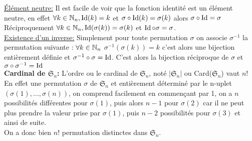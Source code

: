 \underline{Élément neutre:} Il est facile de voir que la fonction identité est un élément neutre, en effet $\forall k \in \mathbb{N}_n,\operatorname{Id}(k)=k$ et $\sigma\circ\operatorname{Id}(k)=\sigma(k)$ alors $\sigma\circ\operatorname{Id}=\sigma$\\
Réciproquement $\forall k \in \mathbb{N}_n,\operatorname{Id}(\sigma(k))=\sigma(k)$ et $\operatorname{Id}\circ\sigma=\sigma$.\\

\underline{Existence d'un inverse:} Simplement pour toute permutation $\sigma$ on associe $\sigma^{-1}$ la permutation suivante : $\forall k \in \mathbb{N}_n$ $\sigma^{-1}(\sigma(k))=k$ c'est alors une bijection entièrement définie et $\sigma^{-1}\circ\sigma=\operatorname{Id}$. C'est alors la bijection réciproque de $\sigma$ et $\sigma\circ\sigma^{-1}=\operatorname{Id}$ \\

\textbf{Cardinal de $\mathfrak{S}_n$:}
L'ordre ou le cardinal de $\mathfrak{S}_n$, noté $\vert \mathfrak{S}_n \vert$ ou Card($\mathfrak{S}_n$) vaut $n!$\\
En effet une permutation $\sigma$ de $\mathfrak{S}_n$ et entièrement déterminé par le n-uplet $(\sigma(1),\dots,\sigma(n))$, on comprend facilement en commençant par 1, on a $n$ possibilités différentes pour $\sigma(1)$, puis alors $n-1$ pour $\sigma(2)$ car il ne peut plus prendre la valeur prise par $\sigma(1)$, puis $n-2$ possibilités pour $\sigma(3)$ et ainsi de suite.\\
On a donc bien $n!$ permutation distinctes dans $\mathfrak{S}_n$.\\

